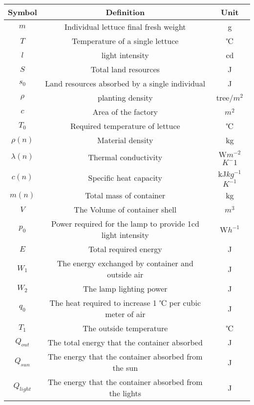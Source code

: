\begin{table}[h]
	\begin{center}
		\begin{tabular}{ccc}
			\toprule[1.5pt]
			Symbol&Definition&Unit\\
			\midrule[1pt]
			\(m\)&Individual lettuce final fresh weight&g\\ 
			\(T\)&Temperature of a single lettuce &℃\\
			\(l\)&light intensity&cd\\
			\(S\)&Total land resources&J\\
			\(s_0\)&Land resources absorbed by a single individual&J\\
			\(\rho\)&planting density&tree/$m^2$\\
			\(c\)&Area of the factory&$m^2$\\
			\(T_0\)&Required temperature of lettuce&℃\\
			\(\rho(n)\)&Material density&kg\cdot{$m^{-3}$}\\
			\(\lambda(n)\)&Thermal conductivity&{W\cdot$m^{-2}$\cdot$K^-1$}\\
			\(c(n)\)&Specific heat capacity&{kJ\cdot$kg^{-1}$\cdot$K^{-1}$}\\
			\(m(n)\)&Total mass of container&kg\\
			\(V\)&The Volume of container shell&$m^3$\\
			
			\(p_0\)&Power required for the lamp to provide 1cd light intensity&W\cdot$h^{-1}$\\
			\(E\)&Total required energy&J\\
            \(W_1\)&The energy exchanged by container and outside air&J\\
            \(W_2\)&The lamp lighting power&J\\
            \(q_0\)&The heat required to increase 1 ℃ per cubic meter of air&J\\
            \(T_1\)&The outside temperature&℃\\
            \(Q_{out}\)&The total energy that the container absorbed&J\\
            \(Q_{sun}\)&The energy that the container absorbed from the sun&J\\
            \(Q_{light}\)&The energy that the container absorbed from the lights&J\\

            
			\bottomrule[1.5pt]
		\end{tabular}
	\end{center}
\end{table}

